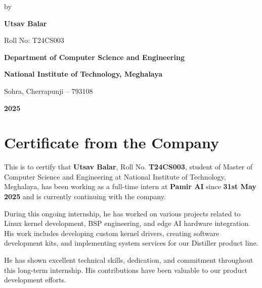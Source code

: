 \documentclass[12pt,a4paper]{report}
\begin{document}
\begin{titlepage}
    {\large by}

    \vspace{0.5cm}

    {\Large\bfseries Utsav Balar}

    {\large Roll No: T24CS003}

    \vfill

    {\large\bfseries Department of Computer Science and Engineering}

    {\large\bfseries National Institute of Technology, Meghalaya}

    {\large Sohra, Cherrapunji -- 793108}

    \vspace{0.5cm}

    {\large\bfseries 2025}

\end{titlepage}


\newpage
\chapter*{Certificate from the Company}

\vspace{1cm}

This is to certify that \textbf{Utsav Balar}, Roll No. \textbf{T24CS003}, student of Master of Computer Science and Engineering at National Institute of Technology, Meghalaya, has been working as a full-time intern at \textbf{Pamir AI} since \textbf{31st May 2025} and is currently continuing with the company.

\vspace{0.5cm}

During this ongoing internship, he has worked on various projects related to Linux kernel development, BSP engineering, and edge AI hardware integration. His work includes developing custom kernel drivers, creating software development kits, and implementing system services for our Distiller product line.

\vspace{0.5cm}

He has shown excellent technical skills, dedication, and commitment throughout this long-term internship. His contributions have been valuable to our product development efforts.
\end{document}
